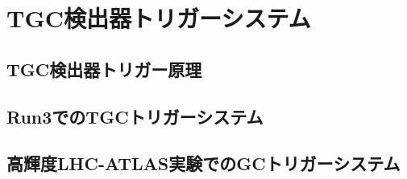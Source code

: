 \section{TGC検出器トリガーシステム}
\label{sec_TGCtrigger}

\subsection{TGC検出器トリガー原理}
\label{subsec_TGCtriprinciple}

\subsection{Run3でのTGCトリガーシステム}
\label{subsec_run3trig}

\subsection{高輝度LHC-ATLAS実験でのGCトリガーシステム}







